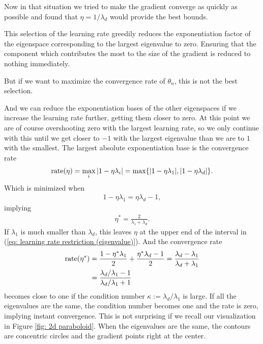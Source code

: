 Now in that situation we tried to make the gradient converge as quickly as
possible and found that \(\eta=1/\lambda_d\) would provide the best bounds.

This selection of the learning rate greedily reduces the exponentiation factor
of the eigenspace corresponding to the largest eigenvalue to zero. Ensuring
that the component which contributes the most to the size of the gradient is
reduced to nothing immediately.

But if we want to maximize the convergence rate of \(\theta_n\), this is not
the best selection.

And we can reduce the exponentiation bases of the other eigenspaces if we
increase the learning rate further, getting them closer to zero. At this point
we are of course overshooting zero with the largest learning rate, so we only
continue with this until we get closer to \(-1\) with the largest eigenvalue
than we are to \(1\) with the smallest. The largest absolute exponentiation base
is the convergence rate
%
\begin{align*}
	\text{rate}(\eta)=\max_{i} |1-\eta\lambda_i| = \max\{|1-\eta\lambda_1|, |1-\eta\lambda_d|\}.
\end{align*}
%
Which is minimized when
%
\begin{align*}
	1-\eta\lambda_1 = \eta\lambda_d -1,
\end{align*}
%
implying
%
\begin{align*}
	\eta^* = \frac{2}{\lambda_1 + \lambda_d}.
\end{align*}
%
If \(\lambda_1\) is much smaller than \(\lambda_d\), this leaves \(\eta\)
at the upper end of the interval in (\ref{eq: learning rate restriction
(eigenvalue)}). And the convergence rate
%
\begin{align*}
	\text{rate}(\eta^*)
	&= \frac{1-\eta^* \lambda_1}{2} + \frac{\eta^*\lambda_d -1}{2}
	= \frac{\lambda_d - \lambda_1}{\lambda_d + \lambda_1}\\
	&= \frac{\lambda_d/\lambda_1-1}{\lambda_d/\lambda_1+1}
\end{align*}
%
becomes close to one if the condition number \(\kappa:=\lambda_d/\lambda_1\)
is large.
If all the eigenvalues are the same, the condition number becomes one and the
rate is zero, implying instant convergence. This is not surprising if we recall
our visualization in Figure \ref{fig: 2d paraboloid}. When the eigenvalues are
the same, the contours are concentric circles and the gradient points right at
the center.




\endinput